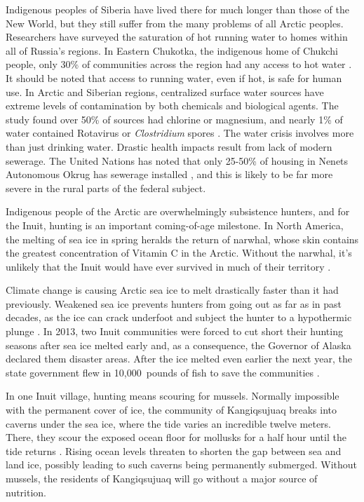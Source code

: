 \documentclass[american]{../../../coursework}
\begin{document}
Indigenous peoples of Siberia have lived there for much longer than those of
the New World, but they still suffer from the many problems of all Arctic
peoples. Researchers have surveyed the saturation of hot running water to
homes within all of Russia's regions. In Eastern Chukotka, the indigenous home
of Chukchi people, only 30\% of communities across the region had any access
to hot water \parencite{Hennessy2016}. It should be noted that access to
running water, even if hot, is safe for human use. In Arctic and Siberian
regions, centralized surface water sources have extreme levels of
contamination by both chemicals and biological agents. The study found over
50\% of sources had chlorine or magnesium, and nearly 1\% of water contained
Rotavirus or \emph{Clostridium} spores \parencite{Dudarev2013}. The water
crisis involves more than just drinking water. Drastic health impacts result
from lack of modern sewerage. The United Nations has noted that only 25-50\%
of housing in Nenets Autonomous Okrug has sewerage installed \parencite{2007},
and this is likely to be far more severe in the rural parts of the federal
subject.

Indigenous people of the Arctic are overwhelmingly subsistence hunters, and
for the Inuit, hunting is an important coming-of-age milestone. In North
America, the melting of sea ice in spring heralds the return of narwhal, whose
skin contains the greatest concentration of Vitamin C in the Arctic. Without
the narwhal, it's unlikely that the Inuit would have ever survived in much of
their territory \parencite{Brown2011}.

Climate change is causing Arctic sea ice to melt drastically faster than it
had previously. Weakened sea ice prevents hunters from going out as far as in
past decades, as the ice can crack underfoot and subject the hunter to a
hypothermic plunge \parencite{Brown2011}. In 2013, two Inuit communities were
forced to cut short their hunting seasons after sea ice melted early and, as a
consequence, the Governor of Alaska declared them disaster areas. After the
ice melted even earlier the next year, the state government flew in
10,000~pounds of fish to save the communities \parencite{Struzik2016}.

In one Inuit village, hunting means scouring for mussels. Normally impossible 
with the permanent cover of ice, the community of Kangiqsujuaq breaks into
caverns under the sea ice, where the tide varies an incredible twelve meters.
There, they scour the exposed ocean floor for mollusks for a half hour until
the tide returns \parencite{Brown2011}. Rising ocean levels threaten to
shorten the gap between sea and land ice, possibly leading to such caverns
being permanently submerged. Without mussels, the residents of Kangiqsujuaq
will go without a major source of nutrition.
\end{document}
